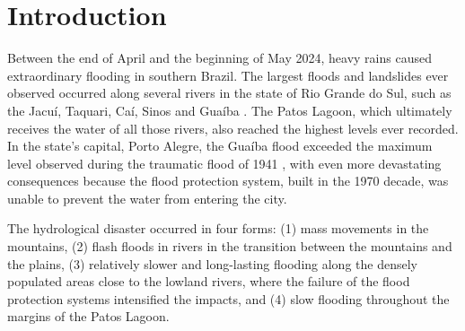 %
%

\section{Introduction} \label{sec:introduction}

Between the end of April and the beginning of May 2024, heavy
rains caused extraordinary flooding in southern Brazil. The
largest floods and landslides ever observed occurred along
several rivers in the state of Rio Grande do Sul, such as the
Jacu\'i, Taquari, Ca\'i, Sinos and Gua\'iba
\parencite{nytimes2024}. The Patos Lagoon, which ultimately
receives the water of all those rivers, also reached the highest
levels ever recorded. In the state's capital, Porto Alegre, the
Gua\'iba flood exceeded the maximum level observed during the
traumatic flood of 1941 \parencite{possa2022b,silveira2023}, with
even more devastating consequences because the flood protection
system, built in the 1970 decade, was unable to prevent the water
from entering the city.

The hydrological disaster occurred in four forms: (1) mass
movements in the mountains, (2) flash floods in rivers in the
transition between the mountains and the plains, (3) relatively
slower and long-lasting flooding along the densely populated
areas close to the lowland rivers, where the failure of the flood
protection systems intensified the impacts, and (4) slow flooding
throughout the margins of the Patos Lagoon.

